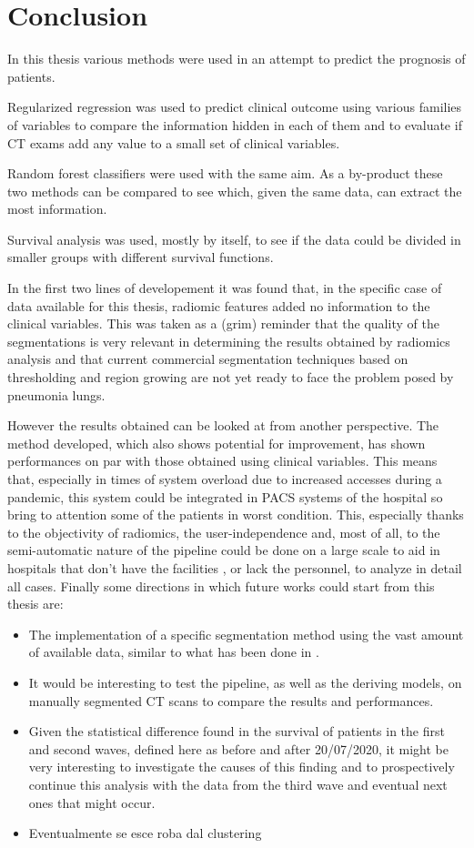 \chapter{Conclusion}

In this thesis various methods were used in an attempt to predict the prognosis of \covid patients. 

Regularized regression was used to predict clinical outcome using various families of variables to compare the information hidden in each of them and to evaluate if CT exams add any value to a small set of clinical variables.

Random forest classifiers were used with the same aim. As a by-product these two methods can be compared to see which, given the same data, can extract the most information.

Survival analysis was used, mostly by itself, to see if the data could be divided in smaller groups with different survival functions.

In the first two lines of developement it was found that, in the specific case of data available for this thesis, radiomic features added no information to the clinical variables.
This was taken as a (grim) reminder that the quality of the segmentations is very relevant in determining the results obtained by radiomics analysis and that current commercial segmentation techniques based on thresholding and region growing are not yet ready to face the problem posed by \covid pneumonia lungs.

However the results obtained can be looked at from another perspective.
The method developed, which also shows potential for improvement, has shown performances on par with those obtained using clinical variables.
This means that, especially in times of system overload due to increased accesses during a pandemic, this system could be integrated in PACS systems of the hospital so bring to attention some of the patients in worst condition.
This, especially thanks to the objectivity of radiomics, the user-independence and, most of all, to the semi-automatic nature of the pipeline could be done on a large scale to aid in hospitals that don't have the facilities , or lack the personnel, to analyze in detail all cases.
Finally some directions in which future works could start from this thesis are:

\begin{itemize}
\item The implementation of a \covid specific segmentation method using the vast amount of available data, similar to what has been done in \cite{Biondi}.
\item It would be interesting to test the pipeline, as well as the deriving models, on manually segmented CT scans to compare the results and performances.
\item Given the statistical difference found in the survival of patients in the first and second waves, defined here as before and after 20/07/2020, it might be very interesting to investigate the causes of this finding and to prospectively continue this analysis with the data from the third wave and eventual next ones that might occur.
\item Eventualmente se esce roba dal clustering
\end{itemize}
